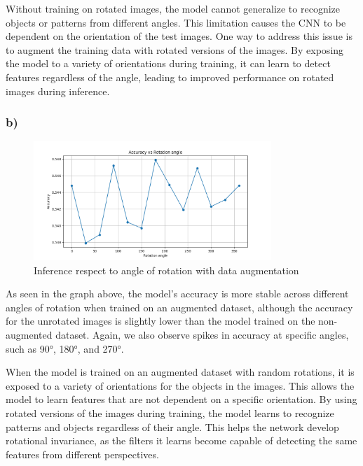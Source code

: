 \documentclass{article}
\begin{document}
Without training on rotated images, the model cannot generalize to recognize objects or patterns from different angles.
This limitation causes the CNN to be dependent on the orientation of the test images. One way to address this issue is to
augment the training data with rotated versions of the images. By exposing the model to a variety of orientations during training,
it can learn to detect features regardless of the angle, leading to improved performance on rotated images during inference.

\subsubsection*{b)}

\begin{figure}[H]
    \centering
    \includegraphics[width=0.8\textwidth]{images/rot_angles_aug.png}
    \caption{Inference respect to angle of rotation with data augmentation}
    \label{fig:angle_inference_aug}
\end{figure}

As seen in the graph above, the model's accuracy is more stable across different angles of rotation when trained on an augmented dataset, although
the accuracy for the unrotated images is slightly lower than the model trained on the non-augmented dataset. Again, we also observe
spikes in accuracy at specific angles, such as 90°, 180°, and 270°.

When the model is trained on an augmented dataset with random rotations, it is exposed to a variety of orientations for
the objects in the images. This allows the model to learn features that are not dependent on a specific orientation. By
using rotated versions of the images during training, the model learns to recognize patterns and objects regardless
of their angle. This helps the network develop rotational invariance, as the filters it learns become capable of detecting
the same features from different perspectives.
\end{document}
